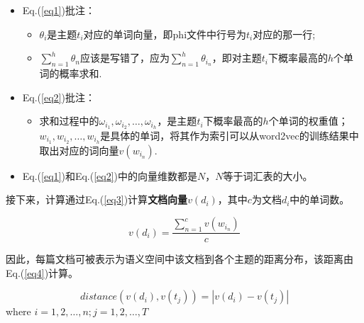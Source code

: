 \documentclass{article}
\begin{document}
\begin{itemize}
	\item Eq.(\ref{eq1})批注：
	\begin{itemize}
		\item $\theta_i$是主题$t_i$对应的单词向量，即phi文件中行号为$t_i$对应的那一行;
		\item $\sum_{n=1}^{h}\theta_n$应该是写错了，应为$\sum_{n=1}^{h}\theta_{i_n}$，即对主题$t_i$下概率最高的$h$个单词的概率求和.
	\end{itemize}
	\item Eq.(\ref{eq2})批注：
	\begin{itemize}
		\item 求和过程中的$\omega_{i_1},\omega_{i_2},\dots,\omega_{i_h}$，是主题$t_i$下概率最高的$h$个单词的权重值；$w_{i_1},w_{i_2},\dots,w_{i_h}$是具体的单词，将其作为索引可以从word2vec的训练结果中取出对应的词向量$v(w_{i_n})$.
	\end{itemize}
	\item Eq.(\ref{eq1})和Eq.(\ref{eq2})中的向量维数都是$N$，$N$等于词汇表的大小。
\end{itemize}

接下来，计算通过Eq.(\ref{eq3})计算\textbf{文档向量}$v(d_i)$，其中$c$为文档$d_i$中的单词数。

\begin{equation}
	v(d_i)=\frac{\sum_{n=1}^{c}v(w_{i_n})}{c} \label{eq3}
\end{equation}

因此，每篇文档可被表示为语义空间中该文档到各个主题的距离分布，该距离由Eq.(\ref{eq4})计算。

\begin{equation}
	distance(v(d_i),v(t_j))=|v(d_i)-v(t_j)| \label{eq4}
\end{equation}
where $i=1,2,\dots,n;j=1,2,\dots,T$
\end{document}
